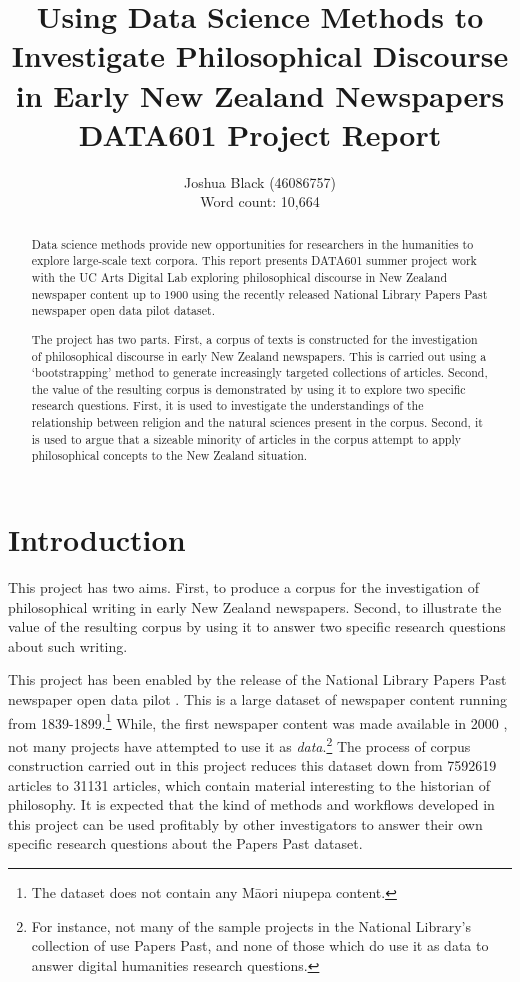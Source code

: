 \documentclass{article}
\title{\textbf{Using Data Science Methods to
Investigate Philosophical Discourse in Early New Zealand Newspapers} \\ DATA601 Project Report}
\author{Joshua Black (46086757) \\ Word count: 10,664}
\begin{document}
\maketitle

\begin{abstract}
  Data science methods provide new opportunities for researchers in the humanities to explore
  large-scale text corpora. This report presents DATA601 summer project work
  with the UC Arts Digital Lab exploring philosophical discourse in
  New Zealand newspaper content up to 1900 using the
  recently released National Library Papers Past newspaper open data pilot
  dataset.

  The project has two parts.
  First, a corpus of texts is constructed for the
  investigation of philosophical discourse in early New Zealand newspapers.
  This is carried out using a `bootstrapping' method to generate increasingly
  targeted collections of articles. Second, the value of the resulting corpus is demonstrated by using it to explore two specific research questions. First, it is used to investigate the understandings of the relationship between religion and the natural sciences present in the corpus. Second, it is used
  to argue that a sizeable minority of articles in the corpus attempt to apply philosophical concepts to the New Zealand situation.
\end{abstract}

\tableofcontents

\section*{Introduction}

This project has two aims. First, to produce a corpus for the investigation of philosophical writing in early New Zealand newspapers.
Second, to illustrate the value of the resulting corpus by using it to
answer two specific research questions about such writing.

This project has been enabled by the release of the National Library Papers Past newspaper open data pilot \cite{ppnodp}. This is a large dataset of newspaper content running from 1839-1899.\footnote{
The dataset does not contain any Māori niupepa content.} While, the first newspaper content was made available in 2000 \cite{pp-about}, not many projects have attempted to use it as \emph{data}.\footnote{For instance, not many of the sample projects in the National Library's collection of \cite{ppnodp-projects} use Papers Past, and none of those which do use it as data to answer digital humanities research questions.}
The process of corpus construction carried out in this project reduces this dataset down from 7592619 articles to 31131 articles, which contain material interesting to the historian of philosophy. It is expected that the kind of methods and workflows developed in this project can be used profitably by other investigators to answer their own specific research questions about the Papers Past dataset.
\end{document}
